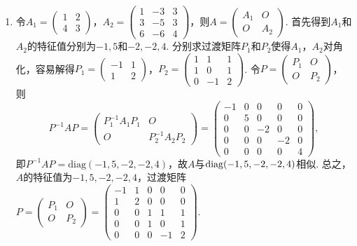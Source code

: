 \begin{enumerate}
    \item 令$A_1=\begin{pmatrix}
        1 & 2 \\ 4 & 3
    \end{pmatrix}$，$A_2=\begin{pmatrix}
        1 & -3 & 3 \\ 3 & -5 & 3 \\ 6 & -6 & 4
    \end{pmatrix}$，则$A=\begin{pmatrix}
        A_1 & O \\ O & A_2
    \end{pmatrix}$. 首先得到$A_1$和$A_2$的特征值分别为$-1,5$和$-2,-2,4$. 分别求过渡矩阵$P_1$和$P_2$使得$A_1$，$A_2$对角化，容易解得$P_1=\begin{pmatrix}
        -1 & 1 \\ 1 & 2
    \end{pmatrix}$，$P_2=\begin{pmatrix}
        1 & 1 & 1 \\ 1 & 0 & 1 \\ 0 & -1 & 2
    \end{pmatrix}$. 令$P=\begin{pmatrix}
        P_1 & O \\ O & P_2
    \end{pmatrix}$，则
    \[P^{-1}AP=\begin{pmatrix}
        P_1^{-1}A_1P_1 & O \\ O & P_2^{-1}A_2P_2
    \end{pmatrix}=\begin{pmatrix}
        -1 & 0 & 0 & 0 & 0 \\ 0 & 5 & 0 & 0 & 0 \\ 0 & 0 & -2 & 0 & 0 \\ 0 & 0 & 0 & -2 & 0 \\ 0 & 0 & 0 & 0 & 4
    \end{pmatrix},\]
    即$P^{-1}AP=\mathrm{diag}(-1,5,-2,-2,4)$，故$A$与$\operatorname{diag}(-1,5,-2,-2,4)$相似. 总之，$A$的特征值为$-1,5,-2,-2,4$，过渡矩阵$P=\begin{pmatrix}
        P_1 & O \\ O & P_2
    \end{pmatrix}=\begin{pmatrix}
        -1 & 1 & 0 & 0 & 0 \\ 1 & 2 & 0 & 0 & 0 \\ 0 & 0 & 1 & 1 & 1 \\ 0 & 0 & 1 & 0 & 1 \\ 0 & 0 & 0 & -1 & 2
    \end{pmatrix}$.


\end{enumerate}
